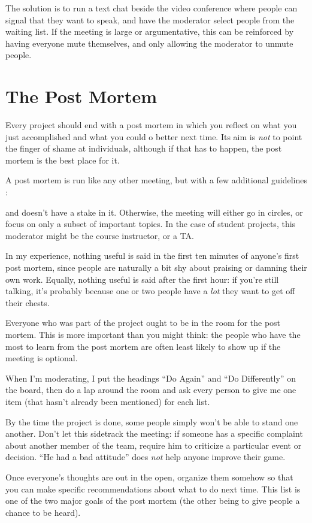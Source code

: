The solution is to run a text chat beside the video conference where
people can signal that they want to speak, and have the moderator select
people from the waiting list. If the meeting is large or argumentative,
this can be reinforced by having everyone mute themselves, and only
allowing the moderator to unmute people.

\section{The Post Mortem}\label{the-post-mortem}

Every project should end with a post mortem in which you reflect on what
you just accomplished and what you could o better next time. Its aim is
\emph{not} to point the finger of shame at individuals, although if that has
to happen, the post mortem is the best place for it.

A post mortem is run like any other meeting, but with a few additional
guidelines \cite{Derb2006}:

\begin{description}
\tightlist
\item[Get a moderator who wasn't part of the project]
and doesn't have a stake in it. Otherwise, the meeting will either
go in circles, or focus on only a subset of important topics. In the
case of student projects, this moderator might be the course
instructor, or a TA.
\item[Set aside an hour, and only an hour.]
In my experience, nothing useful is said in the first ten minutes of
anyone's first post mortem, since people are naturally a bit shy
about praising or damning their own work. Equally, nothing useful is
said after the first hour: if you're still talking, it's probably
because one or two people have a \emph{lot} they want to get off their
chests.
\item[Require attendance.]
Everyone who was part of the project ought to be in the room for the
post mortem. This is more important than you might think: the people
who have the most to learn from the post mortem are often least
likely to show up if the meeting is optional.
\item[Make two lists.]
When I'm moderating, I put the headings ``Do Again'' and ``Do
Differently'' on the board, then do a lap around the room and ask
every person to give me one item (that hasn't already been
mentioned) for each list.
\item[Comment on actions, rather than individuals.]
By the time the project is done, some people simply won't be able to
stand one another. Don't let this sidetrack the meeting: if someone
has a specific complaint about another member of the team, require
him to criticize a particular event or decision. ``He had a bad
attitude'' does \emph{not} help anyone improve their game.
\end{description}

Once everyone's thoughts are out in the open, organize them somehow so
that you can make specific recommendations about what to do next time.
This list is one of the two major goals of the post mortem (the other
being to give people a chance to be heard).
